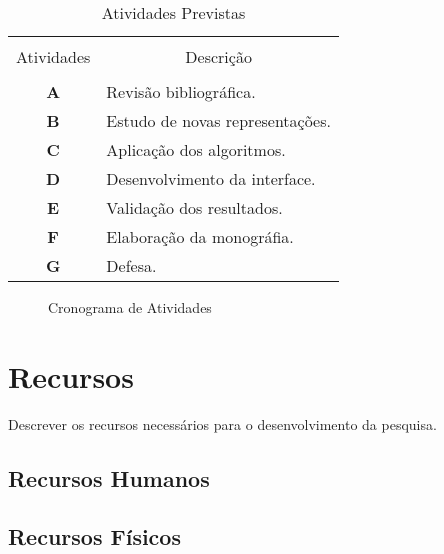 \begin{table}[!htb]
	\centering
	\caption{Atividades Previstas}\label{tb:atividades}
	\begin{tabular}{cp{12cm}}
		\hline \hline &\\[-0.4cm]
		Atividades& \multicolumn{1}{c}{ Descrição} \\
		\hline
		&\\[-0.4cm]
		\textbf{A} & Revisão bibliográfica. \\[0.2cm]
		\textbf{B} &  Estudo de novas representações.\\[0.2cm]
		\textbf{C} &  Aplicação dos algoritmos.\\[0.2cm]
		\textbf{D} &  Desenvolvimento da interface. \\[0.2cm]
		\textbf{E} &  Validação dos resultados.\\[0.2cm]
		\textbf{F} &  Elaboração da monográfia.\\[0.2cm]
		\textbf{G} &  Defesa.\\[0.2cm]
		\hline \hline
	\end{tabular}
\end{table}


\begin{figure}
	\caption{Cronograma de Atividades}\label{fig:cronograma}
	\begin{gantt}{10}{12}
		\begin{ganttitle}
		\end{ganttitle}
	\end{gantt}
	
\end{figure}
\section{Recursos}
Descrever os recursos necessários para o desenvolvimento da pesquisa.
\subsection{Recursos Humanos}
\subsection{Recursos Físicos}
